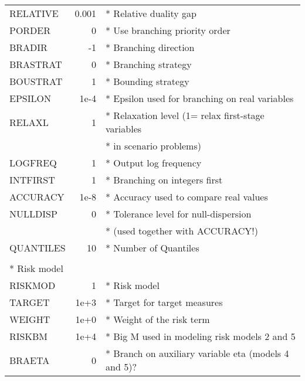 \documentclass[11pt,draft]{article}
\newcommand{\+}{{\ti{+}}}
\newcommand{\1}{{\ti{1}}}
\begin{document}
\begin{appendix}
\begin{center}
{\begin{tabular}{lrl}
RELATIVE      &   0.001 & * Relative duality gap \medskip\\
PORDER      &          0 & * Use branching priority order\\
BRADIR         &     -1 & * Branching direction  \\
BRASTRAT        &     0 & * Branching strategy  \\
BOUSTRAT        &     1 & * Bounding strategy  \\
EPSILON         &   1e-4& * Epsilon used for branching on real variables\\
RELAXL	          &   1 & * Relaxation level (1= relax first-stage variables\\&&* in scenario problems)\\
LOGFREQ            &  1 & * Output log frequency\\
INTFIRST       &      1 & * Branching on integers first\\
ACCURACY       &     1e-8& * Accuracy used to compare real values\\
NULLDISP        &     0 & * Tolerance level for null-dispersion\\&&* (used together with ACCURACY!)\\
QUANTILES      &    10 &* Number of Quantiles\\\medskip\\
\multicolumn{3}{l}{* Risk model}\medskip\\
RISKMOD   &             1 & * Risk model\\
TARGET    &        1e+3 & * Target for target measures\\
WEIGHT   &         1e+0 & * Weight of the risk term\medskip\\
RISKBM   &         1e+4 & * Big M used in modeling risk models 2 and 5\\
BRAETA   &            0 & * Branch on auxiliary variable eta (models 4 and 5)?\\
\end{tabular}}
\end{center}
\end{appendix}
\end{document}
